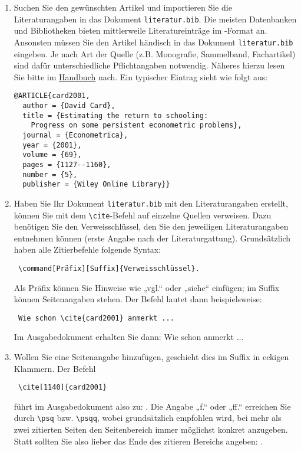 \documentclass{scrbook}
\begin{document}
\begin{enumerate}
\item Suchen Sie den gewünschten Artikel und importieren Sie die Literaturangaben in das Dokument \texttt{literatur.bib}. Die meisten Datenbanken und Bibliotheken bieten mittlerweile Literatureinträge im -Format an. Ansonsten müssen Sie den Artikel händisch in das Dokument \texttt{literatur.bib} eingeben. Je nach Art der Quelle (z.B. Monografie, Sammelband, Fachartikel) sind dafür unterschiedliche Pflichtangaben notwendig. Näheres hierzu lesen Sie bitte im 	\href{https://texdoc.org/pkg/biblatex}{\color{blue}Handbuch} nach. Ein typischer Eintrag sieht wie folgt aus: 
\begin{verbatim}
@ARTICLE{card2001,
  author = {David Card},
  title = {Estimating the return to schooling: 
	Progress on some persistent econometric problems},
  journal = {Econometrica},
  year = {2001},
  volume = {69},
  pages = {1127--1160},
  number = {5},
  publisher = {Wiley Online Library}}
\end{verbatim}

\item Haben Sie Ihr Dokument \texttt{literatur.bib} mit den Literaturangaben erstellt, können Sie mit dem \verb|\cite|-Befehl auf einzelne Quellen verweisen. Dazu benötigen Sie den Verweisschlüssel, den Sie den jeweiligen Literaturangaben entnehmen können (erste Angabe nach der Literaturgattung). Grundsätzlich haben alle Zitierbefehle folgende Syntax: \begin{verbatim} \command[Präfix][Suffix]{Verweisschlüssel}.\end{verbatim} Als Präfix können Sie Hinweise wie „vgl.“ oder „siehe“ einfügen; im Suffix können Seitenangaben stehen. Der Befehl lautet dann beispielsweise: \begin{verbatim} Wie schon \cite{card2001} anmerkt ...  \end{verbatim} Im Ausgabedokument erhalten Sie dann: Wie schon \cite{card2001} anmerkt ...\\

\item Wollen Sie eine Seitenangabe hinzufügen, geschieht dies im Suffix in eckigen Klammern. Der Befehl \begin{verbatim} \cite[1140]{card2001} \end{verbatim} führt im Ausgabedokument also zu: \cite[1140]{card2001}. Die Angabe „f.“ oder „ff.“ erreichen Sie durch \verb|\psq| bzw. \verb|\psqq|, wobei grundsätzlich empfohlen wird, bei mehr als zwei zitierten Seiten den Seitenbereich immer möglichst konkret anzugeben. Statt \cite[1140 \psqq]{card2001} sollten Sie also lieber das Ende des zitieren Bereichs angeben: \cite[1140-1143]{card2001}.\\


\end{enumerate}
\end{document}
